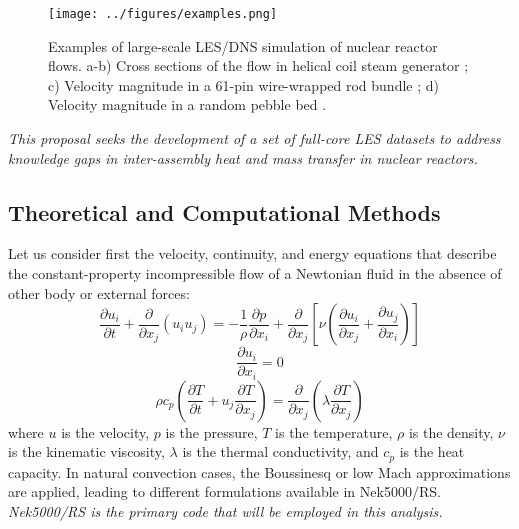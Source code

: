 \begin{figure}[!ht]
\centering
\texttt{[image: ../figures/examples.png]}
\caption{Examples of large-scale LES/DNS simulation of nuclear reactor flows.
a-b) Cross sections of the flow in helical coil steam generator
\cite{alper2018}; c) Velocity magnitude in a 61-pin wire-wrapped rod bundle
\cite{goth2018comparison}; d) Velocity magnitude in a random pebble bed
\cite{yuan2019}.} \label{f:examples}
\end{figure}


\begin{displayquote}
\textit{
This proposal seeks the development of a set of full-core LES
datasets to address knowledge gaps in inter-assembly heat and mass
transfer in nuclear reactors.
}
\end{displayquote}

\vspace{-.25in}
\subsection{Theoretical and Computational Methods}
\vspace{-.2in}

Let us consider first the velocity, continuity, and energy equations that
describe the constant-property incompressible flow of a Newtonian fluid in the
absence of other body or external forces:
\begin{equation}
\frac{\partial  u_i  }{\partial t} +  \frac{\partial}{\partial x_j} \left( u_i u_j \right) =-\frac{1}{\rho} \frac{\partial p}{\partial x_i} + \frac{\partial}{\partial x_j} \left[ \nu \left( \frac{\partial u_i}{\partial x_j} +\frac{\partial u_j}{\partial x_i} \right) \right]
\label{eq:UEqn}
\end{equation}
\begin{equation}
\frac{\partial u_i}{\partial x_i} = 0
\label{eq:rhoEqn}
\end{equation}
\begin{equation}
\rho c_p \left( \frac{\partial T }{\partial t} + u_j \frac{\partial T}{\partial x_j} \right) = \frac{\partial }{\partial x_j} \left( \lambda \frac{\partial T}{\partial x_j} \right)
\label{eq:EEqn}
\end{equation}
where $u$ is the velocity, $p$ is the pressure, $T$ is the temperature, $\rho$
is the  density, $\nu$ is the kinematic viscosity, $\lambda$ is
the thermal conductivity, and $c_p$ is the heat capacity. In natural
convection cases, the Boussinesq or low Mach approximations
\cite{tomboulides1997numerical} are applied, leading to different
formulations available in Nek5000/RS. 
{\it Nek5000/RS is the primary code that will be employed 
in this analysis.}

